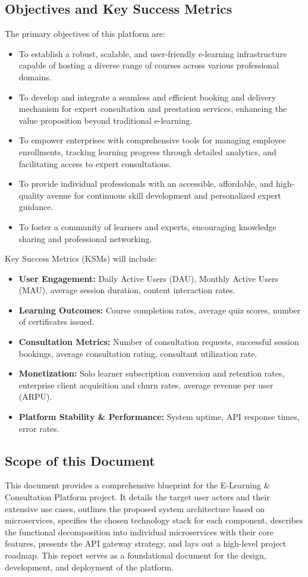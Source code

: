 \documentclass[12pt, a4paper]{report} %
\begin{document}
  \subsection{Objectives and Key Success Metrics}
    The primary objectives of this platform are:
    \begin{itemize}
        \item To establish a robust, scalable, and user-friendly e-learning infrastructure capable of hosting a diverse range of courses across various professional domains.
        \item To develop and integrate a seamless and efficient booking and delivery mechanism for expert consultation and prestation services, enhancing the value proposition beyond traditional e-learning.
        \item To empower enterprises with comprehensive tools for managing employee enrollments, tracking learning progress through detailed analytics, and facilitating access to expert consultations.
        \item To provide individual professionals with an accessible, affordable, and high-quality avenue for continuous skill development and personalized expert guidance.
        \item To foster a community of learners and experts, encouraging knowledge sharing and professional networking.
    \end{itemize}
    Key Success Metrics (KSMs) will include:
    \begin{itemize}
        \item \textbf{User Engagement:} Daily Active Users (DAU), Monthly Active Users (MAU), average session duration, content interaction rates.
        \item \textbf{Learning Outcomes:} Course completion rates, average quiz scores, number of certificates issued.
        \item \textbf{Consultation Metrics:} Number of consultation requests, successful session bookings, average consultation rating, consultant utilization rate.
        \item \textbf{Monetization:} Solo learner subscription conversion and retention rates, enterprise client acquisition and churn rates, average revenue per user (ARPU).
        \item \textbf{Platform Stability \& Performance:} System uptime, API response times, error rates.
    \end{itemize}

  \subsection{Scope of this Document}
    This document provides a comprehensive blueprint for the E-Learning \& Consultation Platform project. It details the target user actors and their extensive use cases, outlines the proposed system architecture based on microservices, specifies the chosen technology stack for each component, describes the functional decomposition into individual microservices with their core features, presents the API gateway strategy, and lays out a high-level project roadmap. This report serves as a foundational document for the design, development, and deployment of the platform.
\end{document}
